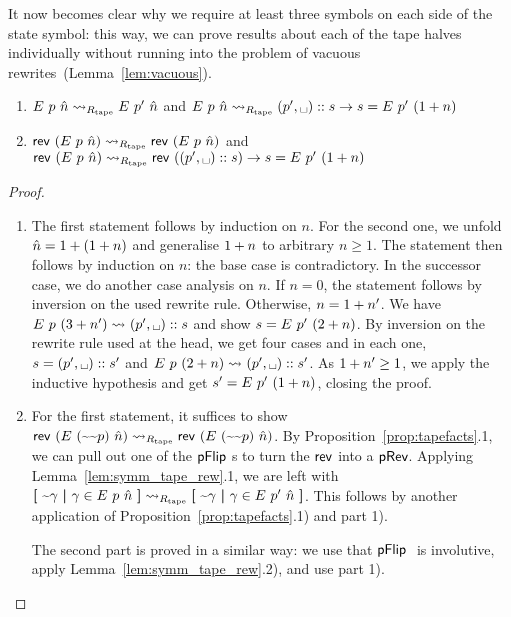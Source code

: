 \begin{remark}
  It now becomes clear why we require at least three symbols on each side of the state symbol: this way, we can prove results about each of the tape halves individually without running into the problem of vacuous rewrites~(Lemma~\ref{lem:vacuous}). 
\end{remark}

\begin{lemma}\label{lem:nilstr_blank}\leavevmode
  \begin{enumerate}
    \item $E~p~\hat{n} \rightsquigarrow_{R_{\text{tape}}} E~p'~\hat{n}$ and $\nilstr{p}{\hat{n}} \strent{\Rtape} (p', \blank) :: s \rightarrow s = \nilstr{p'}{(\natS{n})}$
    \item $\mathsf{rev}~{(E~p~\hat{n})} \rightsquigarrow_{R_{\text{tape}}} \mathsf{rev}~{(E~p~\hat{n})}$ and $\rev~{(\nilstr{p}{\hat{n}})} \strent{\Rtape} \rev~{((p', \blank) :: s)} \rightarrow s = \nilstr{p'}{(\natS{n})}$
  \end{enumerate}
\end{lemma}
\begin{proof}
  \begin{enumerate}
    \item The first statement follows by induction on $n$. For the second one, we unfold $\hat{n} = 1 +{(1 +{n})}$ and generalise $1 +{n}$ to arbitrary $n \ge 1$. The statement then follows by induction on $n$: the base case is contradictory. In the successor case, we do another case analysis on $n$. If $n =0$, the statement follows by inversion on the used rewrite rule. 
      Otherwise, $n = 1 +{n'}$. We have $\nilstr{p}{(3+n')} \strent{} (p', \blank) :: s$ and show $s = E~p'~(2 + n)$. By inversion on the rewrite rule used at the head, we get four cases and in each one, $s = (p', \blank) :: s'$ and $\nilstr{p}{(2+n)} \strent{} (p', \blank) :: s'$. As $1 +{n'} \ge 1$, we apply the inductive hypothesis and get $s' = E~p'~(1 +{n})$, closing the proof. 
    \item For the first statement, it suffices to show $\mathsf{rev}~{(E~(\text{\textasciitilde}\text{\textasciitilde}p)~\hat{n})} \rightsquigarrow_{R_{\text{tape}}} \mathsf{rev}~{(E~(\text{\textasciitilde}\text{\textasciitilde}p)~\hat{n})}$. By Proposition~\ref{prop:tapefacts}.1, we can pull out one of the $\pFlip$s to turn the $\mathsf{rev}$ into a $\textsf{pRev}$. Applying Lemma~\ref{lem:symm_tape_rew}.1, we are left with $\textbf{[}~ \text{\textasciitilde}\gamma ~\textbf{|}~ \gamma \in E~p~\hat{n} ~\textbf{]} \rightsquigarrow_{R_{\text{tape}}} \textbf{[}~ \text{\textasciitilde}\gamma ~\textbf{|}~ \gamma \in E~p'~\hat{n} ~\textbf{]}$. This follows by another application of Proposition~\ref{prop:tapefacts}.1) and part 1). 

      The second part is proved in a similar way: we use that $\pFlip$ is involutive, apply Lemma~\ref{lem:symm_tape_rew}.2), and use part 1).
  \end{enumerate}
\end{proof}

